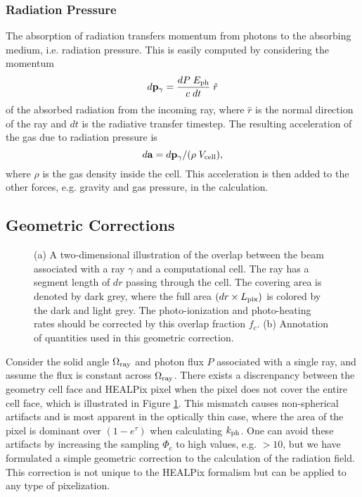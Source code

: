 \documentclass[12pt,preprint]{aastex}
\begin{document}
\subsubsection{Radiation Pressure}

The absorption of radiation transfers momentum from photons to the
absorbing medium, i.e. radiation pressure.  This is easily computed by
considering the momentum
\begin{equation}
  d\mathbf{p}_\gamma = \frac{dP \; E_{\rm ph}}{c\;dt} \; \hat{r}
\end{equation}
of the absorbed radiation from the incoming ray, where $\hat{r}$ is
the normal direction of the ray and $dt$ is the radiative transfer
timestep.  The resulting acceleration of the gas due to radiation
pressure is
\begin{equation}
  d\mathbf{a} = d\mathbf{p}_\gamma / (\rho \; V_{\rm cell}),
\end{equation}
where $\rho$ is the gas density inside the cell.  This acceleration is
then added to the other forces, e.g. gravity and gas pressure, in the
calculation.

\subsection{Geometric Corrections}
\label{sec:meth_fc}

\begin{figure}[t]
  \caption{\label{fig:covering} (a) A two-dimensional illustration of
    the overlap between the beam associated with a ray $\gamma$ and a
    computational cell.  The ray has a segment length of $dr$ passing
    through the cell.  The covering area is denoted by dark grey,
    where the full area $(dr \times L_{\rm pix})$ is colored by the
    dark and light grey.  The photo-ionization and photo-heating rates
    should be corrected by this overlap fraction $f_c$.  (b)
    Annotation of quantities used in this geometric correction.}
\end{figure}

Consider the solid angle $\Omega_{\rm ray}$ and photon flux $P$
associated with a single ray, and assume the flux is constant across
$\Omega_{\rm ray}$.  There exists a discrenpancy between the geometry
cell face and HEALPix pixel when the pixel does not cover the entire
cell face, which is illustrated in Figure \ref{fig:covering}.  This
mismatch causes non-spherical artifacts and is most apparent in the
optically thin case, where the area of the pixel is dominant over $(1
- e^\tau)$ when calculating $k_{\rm ph}$.  One can avoid these
artifacts by increasing the sampling $\Phi_c$ to high values,
e.g. $>10$, but we have formulated a simple geometric correction to
the calculation of the radiation field.  This correction is not unique
to the HEALPix formalism but can be applied to any type of
pixelization.
\end{document}
